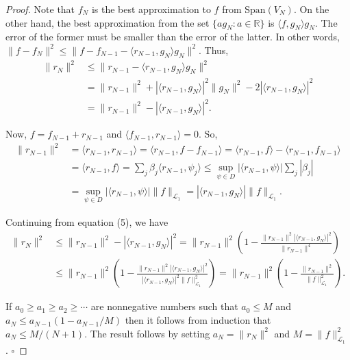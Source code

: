   \begin{proof}
    Note that $f_N$ is the best approximation to $f$ from $\text{Span}(V_N)$. On the other hand, the best approximation from the set $\{a g_N : a \in \mathbb{R}\}$ is $\langle f, g_N \rangle g_N$. The error of the former must be smaller than the error of the latter. In other words, $\|f - f_N\|^2 \leq \|f - f_{N-1} - \langle r_{N-1}, g_N \rangle g_N\|^2$. Thus,
    \begin{align}
      \|r_N\|^2 &\leq \|r_{N-1} - \langle r_{N-1}, g_N \rangle g_N\|^2 \\
      &= \|r_{N-1}\|^2 + |\langle r_{N-1}, g_N \rangle|^2 \|g_N\|^2 - 2|\langle r_{N-1}, g_N \rangle|^2 \\
      &= \|r_{N-1}\|^2 - |\langle r_{N-1}, g_N \rangle|^2. \tag{5}
    \end{align}

    Now, $f = f_{N-1} + r_{N-1}$ and $\langle f_{N-1}, r_{N-1} \rangle = 0$. So,
    \begin{align}
      \|r_{N-1}\|^2 &= \langle r_{N-1}, r_{N-1} \rangle = \langle r_{N-1}, f - f_{N-1} \rangle = \langle r_{N-1}, f \rangle - \langle r_{N-1}, f_{N-1} \rangle \\
      &= \langle r_{N-1}, f \rangle = \sum_j \beta_j \langle r_{N-1}, \psi_j \rangle \leq \sup_{\psi \in D} |\langle r_{N-1}, \psi \rangle| \sum_j |\beta_j| \\
      &= \sup_{\psi \in D} |\langle r_{N-1}, \psi \rangle| \|f\|_{\mathcal{L}_1} = |\langle r_{N-1}, g_N \rangle| \|f\|_{\mathcal{L}_1}.
    \end{align}

    Continuing from equation (5), we have
    \begin{align}
      \|r_N\|^2 &\leq \|r_{N-1}\|^2 - |\langle r_{N-1}, g_N \rangle|^2 = \|r_{N-1}\|^2 \left( 1 - \frac{\|r_{N-1}\|^2 |\langle r_{N-1}, g_N \rangle|^2}{\|r_{N-1}\|^4} \right) \\
      &\leq \|r_{N-1}\|^2 \left( 1 - \frac{\|r_{N-1}\|^2 |\langle r_{N-1}, g_N \rangle|^2}{|\langle r_{N-1}, g_N \rangle|^2 \|f\|_{\mathcal{L}_1}^2} \right) = \|r_{N-1}\|^2 \left( 1 - \frac{\|r_{N-1}\|^2}{\|f\|_{\mathcal{L}_1}^2} \right).
    \end{align}

    If $a_0 \geq a_1 \geq a_2 \geq \cdots$ are nonnegative numbers such that $a_0 \leq M$ and $a_N \leq a_{N-1}(1 - a_{N-1}/M)$ then it follows from induction that $a_N \leq M/(N+1)$. The result follows by setting $a_N = \|r_N\|^2$ and $M = \|f\|_{\mathcal{L}_1}^2$. $\square$
  \end{proof}

